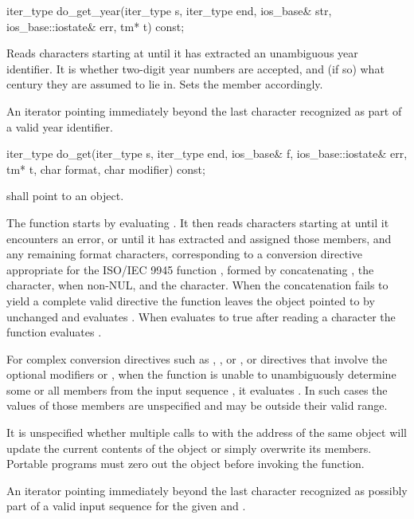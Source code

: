 %
\begin{itemdecl}
iter_type do_get_year(iter_type s, iter_type end, ios_base& str,
                      ios_base::iostate& err, tm* t) const;
\end{itemdecl}

\begin{itemdescr}
\pnum
\effects
Reads characters starting at 
until it has extracted an unambiguous year identifier.
It is
 whether
two-digit year numbers are accepted,
and (if so) what century they are assumed to lie in.
Sets the
member accordingly.

\pnum
\returns
An iterator pointing immediately beyond the last character recognized
as part of a valid year identifier.
\end{itemdescr}

%
\begin{itemdecl}
iter_type do_get(iter_type s, iter_type end, ios_base& f,
    ios_base::iostate& err, tm* t, char format, char modifier) const;
\end{itemdecl}

\begin{itemdescr}
\pnum
\requires
{} shall point to an object.

\pnum
\effects The function starts by evaluating
. It
then reads characters starting at  until it encounters an error, or
until it has extracted and assigned those  members, and any
remaining format characters, corresponding to a conversion directive
appropriate for the ISO/IEC 9945 function , formed by
concatenating , the  character,
when non-NUL, and the 
character. When the concatenation fails to yield a complete valid
directive the function leaves the object pointed to by  unchanged and
evaluates . When 
evaluates to true after reading a character the function evaluates
.

\pnum
For complex conversion directives such as ,
, or , or directives
that involve the optional modifiers  or ,
when the function is unable
to unambiguously determine some or all  members from the input
sequence , it evaluates .
In such cases the values of those  members are unspecified
and may be outside their valid range.

\pnum
\remark It is unspecified whether multiple calls to
 with the
address of the same  object will update the current contents of
the object or simply overwrite its members. Portable programs must zero
out the object before invoking the function.

\pnum
\returns An iterator pointing immediately beyond the last character
recognized as possibly part of a valid input sequence for the given
 and .
\end{itemdescr}

